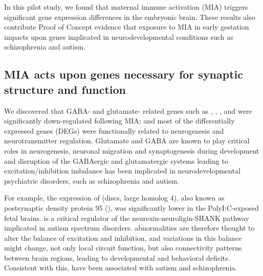 In this pilot study, we found that maternal immune activation (MIA) triggers significant gene expression differences in the embryonic brain. 
These results also contribute Proof of Concept evidence that exposure to MIA in early gestation impacts upon genes implicated in neurodevelopmental conditions such as schizophrenia and autism. 

\subsection{MIA acts upon genes necessary for synaptic structure and function}
We discovered that GABA- and glutamate- related genes such as , , ,  and  were significantly down-regulated following MIA; and most of the differentially expressed genes (DEGs) were functionally related to neurogenesis and neurotransmitter regulation.
Glutamate and GABA are known to play critical roles in neurogenesis, neuronal migration and synaptogenesis during development\cite{Cameron1998,LaMantia1995,LoTurco1995} and disruption of the GABAergic and glutamatergic systems leading to excitation/inhibition imbalance has been implicated in neurodevelopmental psychiatric disorders, such as schizophrenia\cite{Wassef2003} and autism\cite{Rubenstein2003}.

For example, the expression of  (discs, large homolog 4), also known as postsynaptic density protein 95 ()\cite{DeBartolomeis2014}, was significantly lower in the PolyI:C-exposed fetal brains. 
 is a critical regulator of the neurexin-neuroligin-SHANK pathway implicated in autism spectrum disorders\cite{Feyder2010}.
 abnormalities are therefore thought to alter the balance of excitation and inhibition, and variations in this balance might change, not only local circuit function, but also connectivity patterns between brain regions, leading to developmental and behavioral deficits\cite{Cline2005}. 
Consistent with this,  have been associated with autism\cite{Risch1999} and schizophrenia\cite{Hahn2006}. 

